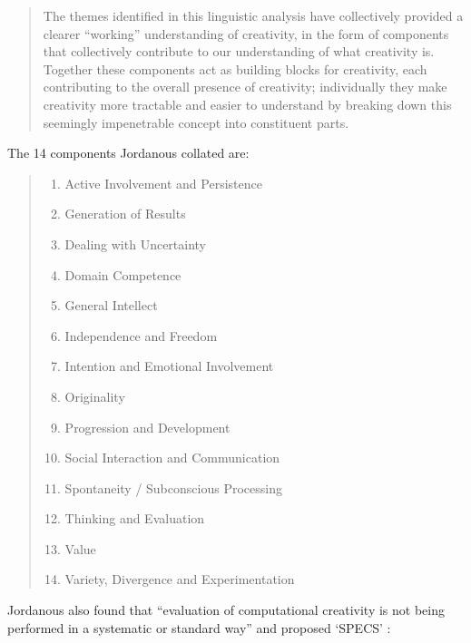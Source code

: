 \begin{quotation}
  The themes identified in this linguistic analysis have collectively provided a clearer ``working'' understanding of creativity, in the form of components that collectively contribute to our understanding of what creativity is. Together these components act as building blocks for creativity, each contributing to the overall presence of creativity; individually they make creativity more tractable and easier to understand by breaking down this seemingly impenetrable concept into constituent parts. 
\end{quotation}

The \num{14} components Jordanous collated are: \citeyear[p.118-120]{Jordanous2012}
\begin{quotation}
  \begin{enumerate}
    \item Active Involvement and Persistence
    \item Generation of Results
    \item Dealing with Uncertainty
    \item Domain Competence
    \item General Intellect
    \item Independence and Freedom
    \item Intention and Emotional Involvement
    \item Originality
    \item Progression and Development
    \item Social Interaction and Communication
    \item Spontaneity / Subconscious Processing
    \item Thinking and Evaluation
    \item Value
    \item Variety, Divergence and Experimentation
  \end{enumerate}
\end{quotation}

Jordanous also found that ``evaluation of computational creativity is not being performed in a systematic or standard way'' \citeyear[p.2]{Jordanous2011} and proposed `\ac{SPECS}' \citeyear[p.137-140]{Jordanous2012a}:

